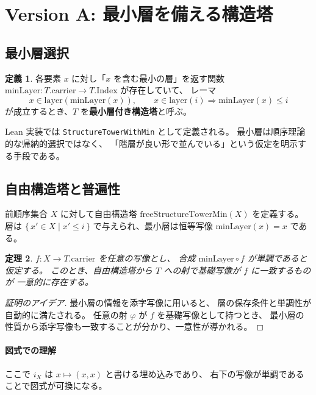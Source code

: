 \documentclass[luatex,a4paper]{ltjsarticle}
\theoremstyle{definition}
\newtheorem{definition}{定義}[section]
\theoremstyle{plain}
\newtheorem{theorem}[definition]{定理}
\theoremstyle{remark}
\begin{document}
\section{Version A: 最小層を備える構造塔}
\subsection{最小層選択}
\begin{definition}
各要素 $x$ に対し「$x$ を含む最小の層」を返す関数
$\mathrm{minLayer} : T.\mathrm{carrier} \to T.\mathrm{Index}$ が存在していて、
レーマ
\[
  x \in \mathrm{layer}(\mathrm{minLayer}(x)),
  \qquad
  x \in \mathrm{layer}(i) \Rightarrow \mathrm{minLayer}(x) \leq i
\]
が成立するとき、$T$ を\textbf{最小層付き構造塔}と呼ぶ。
\end{definition}

Lean 実装では \texttt{StructureTowerWithMin} として定義される。
最小層は順序理論的な帰納的選択ではなく、
「階層が良い形で並んでいる」という仮定を明示する手段である。

\subsection{自由構造塔と普遍性}
前順序集合 $X$ に対して自由構造塔 $\mathrm{freeStructureTowerMin}(X)$ を定義する。
層は $\{\,x' \in X \mid x' \leq i\,\}$ で与えられ、最小層は恒等写像
$\mathrm{minLayer}(x) = x$ である。

\begin{theorem}
$f : X \to T.\mathrm{carrier}$ を任意の写像とし、
合成 $\mathrm{minLayer} \circ f$ が単調であると仮定する。
このとき、自由構造塔から $T$ への射で基礎写像が $f$ に一致するものが
一意的に存在する。
\end{theorem}
\begin{proof}[証明のアイデア]
最小層の情報を添字写像に用いると、
層の保存条件と単調性が自動的に満たされる。
任意の射 $\varphi$ が $f$ を基礎写像として持つとき、
最小層の性質から添字写像も一致することが分かり、一意性が導かれる。
\end{proof}

\paragraph{図式での理解}
\begin{center}
\end{center}
ここで $i_X$ は $x \mapsto (x,x)$ と書ける埋め込みであり、
右下の写像が単調であることで図式が可換になる。
\end{document}
